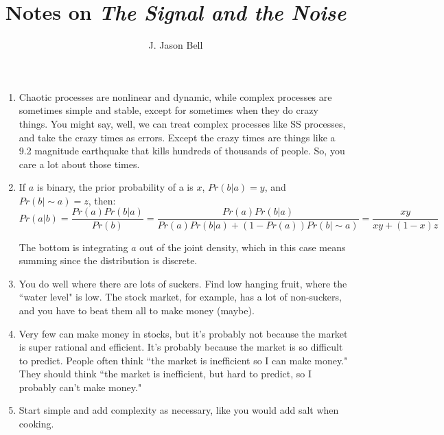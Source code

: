 \documentclass[11pt, oneside]{article}   	%
\title{Notes on \textit{The Signal and the Noise}}
\author{J. Jason Bell}
\begin{document}
\maketitle

\begin{enumerate}
\item Chaotic processes are nonlinear and dynamic, while complex processes are sometimes simple and stable, except for sometimes when they do crazy things.  You might say, well, we can treat complex processes like SS processes, and take the crazy times as errors.  Except the crazy times are things like a 9.2 magnitude earthquake that kills hundreds of thousands of people.  So, you care a lot about those times.    
\item If $a$ is binary, the prior probability of a is $x$,  $Pr(b | a) = y$, and $Pr(b | \sim a) = z$, then: $$Pr(a |b) =  \frac{Pr(a) Pr(b|a)}{Pr(b)} = \frac{Pr(a) Pr(b|a)} {Pr(a)Pr(b|a) + (1 - Pr(a))Pr(b| \sim a) } =  \frac{x y} {xy + (1 - x) z}$$

The bottom is integrating $a$ out of the joint density, which in this case means summing since the distribution is discrete.

\item You do well where there are lots of suckers.  Find low hanging fruit, where the ``water level" is low.  The stock market, for example, has a lot of non-suckers, and you have to beat them all to make money (maybe). 

\item Very few can make money in stocks, but it's probably not because the market is super rational and efficient.  It's probably because the market is so difficult to predict.  People often think ``the market is inefficient so I can make money."  They should think ``the market is inefficient, but hard to predict, so I probably can't make money."  

\item Start simple and add complexity as necessary, like you would add salt when cooking.  


\end{enumerate}
\end{document}
